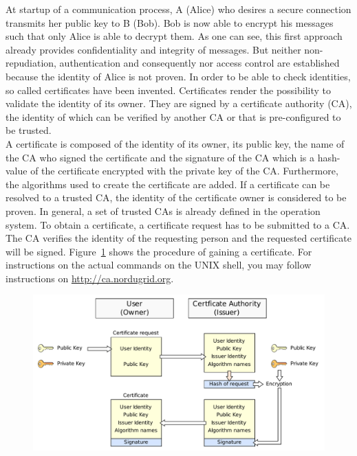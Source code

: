 At startup of a communication process, A (Alice) who desires a secure connection transmits her public key to B (Bob).
Bob is now able to encrypt his messages such that only Alice is able to decrypt them.
As one can see, this first approach already provides confidentiality and integrity of messages.
But neither non-repudiation, authentication and consequently nor access control are established because the identity of Alice is not proven.
In order to be able to check identities, so called certificates have been invented.
Certificates render the possibility to validate the identity of its owner.
They are signed by a certificate authority (CA), the identity of which can be verified by another CA or that is pre-configured to be trusted.\\


A certificate is composed of the identity of its owner, its public key, the name of the CA who signed the certificate and the signature of the CA which is a hash-value of the certificate encrypted with the private key of the CA. 
Furthermore, the algorithms used to create the certificate are added.
If a certificate can be resolved to a trusted CA, the identity of the certificate owner is considered to be proven. 
In general, a set of trusted CAs is already defined in the operation system.
To obtain a certificate, a certificate request has to be submitted to a CA.
The CA verifies the identity of the requesting person and the requested certificate will be signed.
Figure~\ref{fig:certificate_request} shows the procedure of gaining a certificate.
For instructions on the actual commands on the UNIX shell, you may follow instructions on \url{http://ca.nordugrid.org}.
\begin{figure}[htb]
	\centering%
 	\includegraphics[width=13cm]{tex_tls_echoservice/certificates.pdf}
	\label{fig:certificate_request}
\end{figure}
